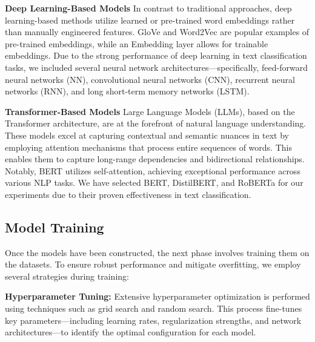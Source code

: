 \documentclass[runningheads]{llncs}
\begin{document}
\vspace{0.25\baselineskip}
\noindent \textbf{Deep Learning-Based Models}
% 
In contrast to traditional approaches, deep learning-based methods utilize learned or pre-trained word embeddings rather than manually engineered features. GloVe and Word2Vec are popular examples of pre-trained embeddings, while an Embedding layer allows for trainable embeddings. Due to the strong performance of deep learning in text classification tasks, we included several neural network architectures—specifically, feed-forward neural networks (NN), convolutional neural networks (CNN), recurrent neural networks (RNN), and long short-term memory networks (LSTM).


\vspace{0.25\baselineskip}
\noindent \textbf{Transformer-Based Models}
% 
Large Language Models (LLMs), based on the Transformer architecture, are at the forefront of natural language understanding. These models excel at capturing contextual and semantic nuances in text by employing attention mechanisms that process entire sequences of words. This enables them to capture long-range dependencies and bidirectional relationships. Notably, BERT utilizes self-attention, achieving exceptional performance across various NLP tasks. We have selected BERT, DistilBERT, and RoBERTa for our experiments due to their proven effectiveness in text classification.


\subsection{Model Training}

Once the models have been constructed, the next phase involves training them on the datasets. To ensure robust performance and mitigate overfitting, we employ several strategies during training:

\vspace{0.25\baselineskip}
\noindent \textbf{Hyperparameter Tuning:} Extensive hyperparameter optimization is performed using techniques such as grid search and random search. This process fine-tunes key parameters—including learning rates, regularization strengths, and network architectures—to identify the optimal configuration for each model.
    
\end{document}
